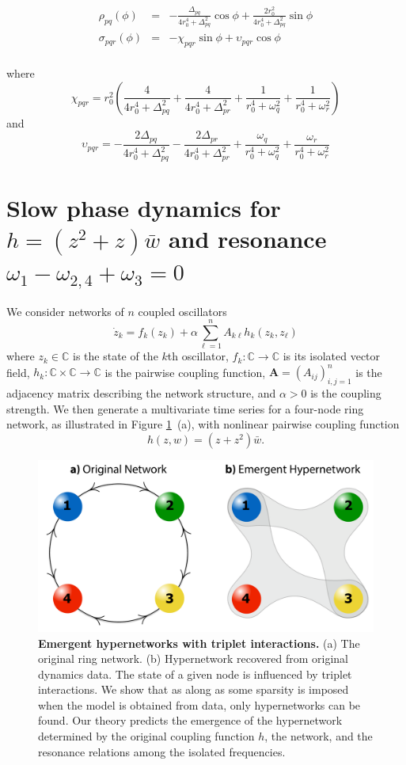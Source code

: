 \documentclass[12pt]{article}
\theoremstyle{plain}
\theoremstyle{definition}
\theoremstyle{remark}
\theoremstyle{remark}
\begin{document}
\begin{eqnarray}
\rho_{pq}(\phi)  &=& - \frac{\Delta_{pq}}{4 r_0^4 + \Delta_{pq}^2} \cos \phi +  \frac{2r_0^2}{4 r_0^4 + \Delta_{pq}^2} \sin \phi \nonumber \\
\sigma_{pqr}(\phi) &=& - \chi_{pqr} \sin \phi + \upsilon_{pqr} \cos \phi \nonumber \\
\end{eqnarray}


where 
$$
\chi_{pqr} = r_0^2 \left( \frac{4}{4 r_0^4 +  \Delta_{pq}^2} 
+ \frac{4}{4 r_0^4 +  \Delta_{pr}^2} 
+ \frac{1}{r_0^4 + \omega_q^2} 
+ \frac{1}{r_0^4 + \omega_r^2} \right)
$$
and
$$
\upsilon_{pqr} =  - \frac{ 2\Delta_{pq}}{4 r_0^4 +  \Delta_{pq}^2} 
- \frac{2 \Delta_{pr}}{4 r_0^4 +  \Delta_{pr}^2} 
+ \frac{\omega_q}{r_0^4 + \omega_q^2} 
+ \frac{\omega_r}{r_0^4 + \omega_r^2}
$$


\section{Slow phase dynamics for $h = (z^2 +  z) \bar w$ and resonance $\omega_1 - \omega_{2,4} + \omega_3 = 0$}
We consider networks of $n$ coupled oscillators
\begin{equation}\label{Eq1}
\dot{z}_k = f_k(z_k) + \alpha \sum_{\ell=1}^n A_{k\ell} h_k(z_k, z_{\ell})
\end{equation}
where $z_k \in \mathbb{C}$ is the state of the $k$th oscillator, $f_k :  \mathbb{C} \rightarrow  \mathbb{C}$  is its isolated vector field, $h_k:  \mathbb{C} \times  \mathbb{C} \rightarrow  \mathbb{C}$ is the pairwise coupling function, $ \bm A = ( A_{ij})_{i,j=1}^n$ is the adjacency matrix describing the network structure, and $\alpha > 0 $ is the coupling strength.  We then generate a multivariate time series for a four-node ring network, as illustrated in Figure \ref{fig:networks}~(a), with nonlinear pairwise coupling function
\begin{equation}\label{degree3}
h(z,w) = (z + z^2) \bar w. 
\end{equation} 
\noindent 

\begin{figure}
\centering
\includegraphics[width=.60\columnwidth]{model_illustration2.pdf}
\caption{{\bf Emergent hypernetworks with triplet interactions.} (a) The original ring network. (b) Hypernetwork recovered from original dynamics data. The state of a given node is influenced by triplet interactions. We show that as along as some sparsity is imposed when the model is obtained from data, only hypernetworks can be found. Our theory predicts the emergence of the hypernetwork determined by the original coupling function $h$, the network, and the resonance relations among the isolated frequencies.}
    \label{fig:networks}
\end{figure}
\end{document}
